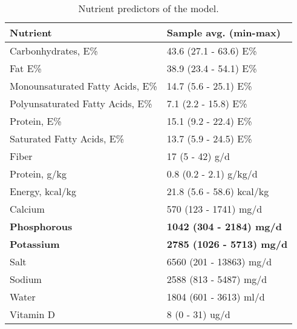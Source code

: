 \documentclass[border=1mm, preview]{standalone}
\begin{document}
\begin{table}[H]

\caption{\label{tab:table1}Nutrient predictors of the model.}
\centering
\begin{tabu} to 
\toprule
\textbf{Nutrient} & \textbf{Sample avg. (min-max)}\\
\midrule
Carbonhydrates, E\% & 43.6 (27.1 - 63.6) E\%\\
Fat E\% & 38.9 (23.4 - 54.1) E\%\\
Monounsaturated Fatty Acids, E\% & 14.7 (5.6 - 25.1) E\%\\
Polyunsaturated Fatty Acids, E\% & 7.1 (2.2 - 15.8) E\%\\
Protein, E\% & 15.1 (9.2 - 22.4) E\%\\
\addlinespace
Saturated Fatty Acids, E\% & 13.7 (5.9 - 24.5) E\%\\
Fiber & 17 (5 - 42) g/d\\
Protein, g/kg & 0.8 (0.2 - 2.1) g/kg/d\\
Energy, kcal/kg & 21.8 (5.6 - 58.6) kcal/kg\\
Calcium & 570 (123 - 1741) mg/d\\
\addlinespace
\textbf{Phosphorous} & \textbf{1042 (304 - 2184) mg/d}\\
\textbf{Potassium} & \textbf{2785 (1026 - 5713) mg/d}\\
Salt & 6560 (201 - 13863) mg/d\\
Sodium & 2588 (813 - 5487) mg/d\\
Water & 1804 (601 - 3613) ml/d\\
\addlinespace
Vitamin D & 8 (0 - 31) ug/d\\
\bottomrule
\end{tabu}
\end{table}
\end{document}
